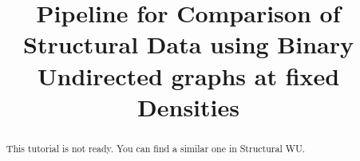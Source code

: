 \documentclass[justified]{tufte-handout}
\title{Pipeline for Comparison of Structural Data using Binary Undirected graphs at fixed Densities}
\begin{document}
\maketitle

\begin{abstract}
\noindent
This tutorial is not ready. You can find a similar one in Structural WU.
\end{abstract}
\end{document}
